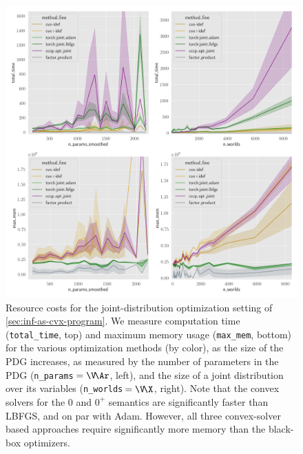 \begin{figure}
    \includegraphics[width=\linewidth]{figs/rand-joint/resource-costs}
    \caption{\small
        Resource costs for the joint-distribution optimization setting of \cref{sec:inf-as-cvx-program}.
        We measure computation time (\texttt{total\_time}, top) and maximum memory usage (\texttt{max\_mem}, bottom) for the various optimization methods (by color), as the size of the PDG increases, as measured by the number of parameters in the PDG (\texttt{n\_params}$\,=\V\!\Ar$, left), and the size of a joint distribution over its variables (\texttt{n\_worlds}$\,=\V\!\X$, right).
        Note that the convex solvers for the 0 and $0^+$ semantics are significantly faster than LBFGS, and on par with Adam.
        However, all three convex-solver based approaches require significantly more memory than the black-box optimizers.
     }\label{fig:resources}
\end{figure}



